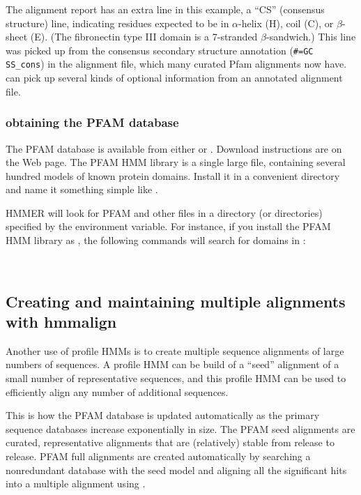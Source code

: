 The alignment report has an extra line in this example, a ``CS''
(consensus structure) line, indicating residues expected to be in
$\alpha$-helix (H), coil (C), or $\beta$-sheet (E). (The fibronectin
type III domain is a 7-stranded $\beta$-sandwich.) This line was
picked up from the consensus secondary structure annotation
(\verb+#=GC SS_cons+) in the  alignment file, which many
curated Pfam alignments now have.  can pick up several
kinds of optional information from an annotated alignment file.

\subsubsection{obtaining the PFAM database}

The PFAM database is available from either  or
.
Download instructions are on the Web page. The PFAM HMM library is a
single large file, containing several hundred models of known protein
domains. Install it in a convenient directory and name it something
simple like .

HMMER will look for PFAM and other files in a directory (or
directories) specified by the  environment variable.
For instance, if you install the PFAM HMM library as
, the following commands will search
for domains in :

\\


\subsection{Creating and maintaining multiple alignments with hmmalign}

Another use of profile HMMs is to create multiple sequence alignments
of large numbers of sequences. A profile HMM can be build of a
``seed'' alignment of a small number of representative sequences, and
this profile HMM can be used to efficiently align any number of
additional sequences. 

This is how the PFAM database is updated automatically as the primary
sequence databases increase exponentially in size. The PFAM seed
alignments are curated, representative alignments that are
(relatively) stable from release to release. PFAM full alignments are
created automatically by searching a nonredundant database with the
seed model and aligning all the significant hits into a multiple
alignment using .

